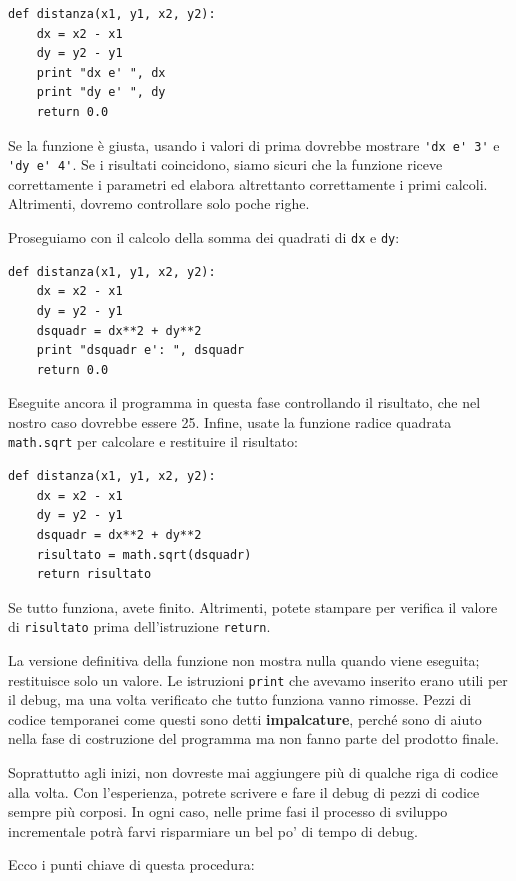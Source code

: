 \documentclass[10pt]{book}
\begin{document}
\begin{verbatim}
def distanza(x1, y1, x2, y2):
    dx = x2 - x1
    dy = y2 - y1
    print "dx e' ", dx
    print "dy e' ", dy
    return 0.0
\end{verbatim}
%
Se la funzione è giusta, usando i valori di prima dovrebbe mostrare \verb"'dx e' 3'" e \verb"'dy e' 4'". Se i risultati coincidono, siamo sicuri che la funzione riceve correttamente i parametri ed elabora altrettanto correttamente i primi calcoli. Altrimenti, dovremo controllare solo poche righe.

Proseguiamo con il calcolo della somma dei quadrati di {\tt dx} e {\tt dy}:

\begin{verbatim}
def distanza(x1, y1, x2, y2):
    dx = x2 - x1
    dy = y2 - y1
    dsquadr = dx**2 + dy**2
    print "dsquadr e': ", dsquadr
    return 0.0
\end{verbatim}
%
Eseguite ancora il programma in questa fase controllando il risultato, che nel nostro caso dovrebbe essere 25.
Infine, usate la funzione radice quadrata {\tt math.sqrt} per calcolare e restituire il risultato:

\begin{verbatim}
def distanza(x1, y1, x2, y2):
    dx = x2 - x1
    dy = y2 - y1
    dsquadr = dx**2 + dy**2
    risultato = math.sqrt(dsquadr)
    return risultato
\end{verbatim}
%
Se tutto funziona, avete finito. Altrimenti, potete stampare per verifica il valore di {\tt risultato} prima dell'istruzione {\tt return}.

La versione definitiva della funzione non mostra nulla quando viene eseguita; restituisce solo un valore. Le istruzioni {\tt print} che avevamo inserito erano utili per il debug, ma una volta verificato che tutto funziona vanno rimosse. Pezzi di codice temporanei come questi sono detti {\bf impalcature}, perché sono di aiuto nella fase di costruzione del programma ma non fanno parte del prodotto finale. 

Soprattutto agli inizi, non dovreste mai aggiungere più di qualche riga
di codice alla volta. Con l'esperienza, potrete scrivere e fare il debug di pezzi di codice sempre più corposi. In ogni caso, nelle prime fasi il processo di sviluppo incrementale potrà farvi risparmiare un bel po' di tempo di debug.

Ecco i punti chiave di questa procedura:
\end{document}
